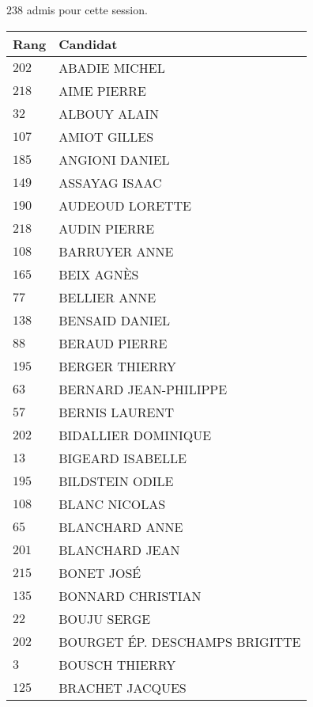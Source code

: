 



  $238$ admis pour cette session.

  \begin{xltabular}{\linewidth}{|l|X|}
    \hline
    \textbf{Rang} & \textbf{Candidat} \\
    \hline
    $202$ & ABADIE MICHEL \\
    \hline
    $218$ & AIME PIERRE \\
    \hline
    $32$ & ALBOUY ALAIN \\
    \hline
    $107$ & AMIOT GILLES \\
    \hline
    $185$ & ANGIONI DANIEL \\
    \hline
    $149$ & ASSAYAG ISAAC \\
    \hline
    $190$ & AUDEOUD LORETTE \\
    \hline
    $218$ & AUDIN PIERRE \\
    \hline
    $108$ & BARRUYER ANNE \\
    \hline
    $165$ & BEIX AGNÈS \\
    \hline
    $77$ & BELLIER ANNE \\
    \hline
    $138$ & BENSAID DANIEL \\
    \hline
    $88$ & BERAUD PIERRE \\
    \hline
    $195$ & BERGER THIERRY \\
    \hline
    $63$ & BERNARD JEAN-PHILIPPE \\
    \hline
    $57$ & BERNIS LAURENT \\
    \hline
    $202$ & BIDALLIER DOMINIQUE \\
    \hline
    $13$ & BIGEARD ISABELLE \\
    \hline
    $195$ & BILDSTEIN ODILE \\
    \hline
    $108$ & BLANC NICOLAS \\
    \hline
    $65$ & BLANCHARD ANNE \\
    \hline
    $201$ & BLANCHARD JEAN \\
    \hline
    $215$ & BONET JOSÉ \\
    \hline
    $135$ & BONNARD CHRISTIAN \\
    \hline
    $22$ & BOUJU SERGE \\
    \hline
    $202$ & BOURGET ÉP. DESCHAMPS BRIGITTE \\
    \hline
    $3$ & BOUSCH THIERRY \\
    \hline
    $125$ & BRACHET JACQUES \\

\end{xltabular}
